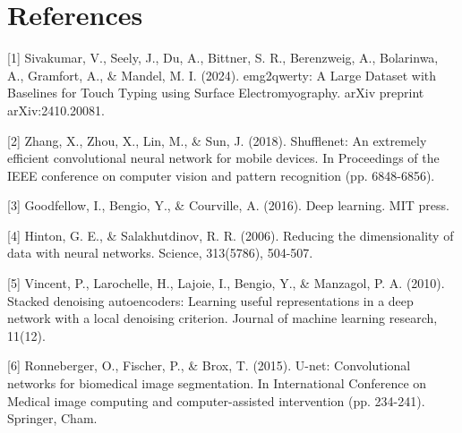 \section*{References}

{
\small

[1] Sivakumar, V., Seely, J., Du, A., Bittner, S. R., Berenzweig, A., Bolarinwa, A., Gramfort, A., \& Mandel, M. I. (2024). emg2qwerty: A Large Dataset with Baselines for Touch Typing using Surface Electromyography. arXiv preprint arXiv:2410.20081.

[2] Zhang, X., Zhou, X., Lin, M., \& Sun, J. (2018). Shufflenet: An extremely efficient convolutional neural network for mobile devices. In Proceedings of the IEEE conference on computer vision and pattern recognition (pp. 6848-6856).

    [3] Goodfellow, I., Bengio, Y., \& Courville, A. (2016). Deep learning. MIT press.

    [4] Hinton, G. E., \& Salakhutdinov, R. R. (2006). Reducing the dimensionality of data with neural networks. Science, 313(5786), 504-507.

[5] Vincent, P., Larochelle, H., Lajoie, I., Bengio, Y., \& Manzagol, P. A. (2010). Stacked denoising autoencoders: Learning useful representations in a deep network with a local denoising criterion. Journal of machine learning research, 11(12).

    [6] Ronneberger, O., Fischer, P., \& Brox, T. (2015). U-net: Convolutional networks for biomedical image segmentation. In International Conference on Medical image computing and computer-assisted intervention (pp. 234-241). Springer, Cham.

}
